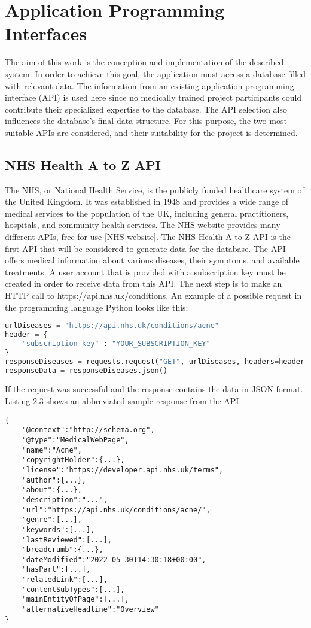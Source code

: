 \section{Application Programming Interfaces}
The aim of this work is the conception and implementation of the described system. In order to achieve this goal, the application must access a database filled with relevant data. The information from an existing application programming interface (API) is used here since no medically trained project participants could contribute their specialized expertise to the database. The API selection also influences the database's final data structure. For this purpose, the two most suitable APIs are considered, and their suitability for the project is determined.

\subsection{NHS Health A to Z API}
The NHS, or National Health Service, is the publicly funded healthcare system of the United Kingdom. It was established in 1948 and provides a wide range of medical services to the population of the UK, including general practitioners, hospitals, and community health services. The NHS website provides many different APIs, free for use [NHS website]. The NHS Health A to Z API is the first API that will be considered to generate data for the database.
The API offers medical information about various diseases, their symptoms, and available treatments. A user account that is provided with a subscription key must be created in order to receive data from this API. The next step is to make an HTTP call to https://api.nhs.uk/conditions. An example of a possible request in the programming language Python looks like this:
\begin{lstlisting}[language=Python, caption={Example Python Request for the Health A to Z API}]
urlDiseases = "https://api.nhs.uk/conditions/acne"
header = {
	"subscription-key" : "YOUR_SUBSCRIPTION_KEY"
}
responseDiseases = requests.request("GET", urlDiseases, headers=header)
responseData = responseDiseases.json()
\end{lstlisting}
If the request was successful and the response contains the data in JSON format. Listing 2.3 shows an abbreviated sample response from the API.
\begin{lstlisting}[caption={Example Response for the Health A to Z API}]
{
	"@context":"http://schema.org",
	"@type":"MedicalWebPage",
	"name":"Acne",
	"copyrightHolder":{...},
	"license":"https://developer.api.nhs.uk/terms",
	"author":{...},
	"about":{...},
	"description":"...",
	"url":"https://api.nhs.uk/conditions/acne/",
	"genre":[...],
	"keywords":[...],
	"lastReviewed":[...],
	"breadcrumb":{...},
	"dateModified":"2022-05-30T14:30:18+00:00",
	"hasPart":[...],
	"relatedLink":[...],
	"contentSubTypes":[...],
	"mainEntityOfPage":[...],
	"alternativeHeadline":"Overview"
}
\end{lstlisting}
